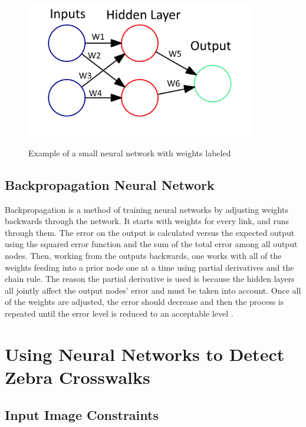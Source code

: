\documentclass[12pt]{ucthesis}
\newcommand{\captionfonts}{\small\bf\ssp}
\begin{document}
\begin{figure}[t]
\begin{center}
\includegraphics[width=10cm]{simpler.png}
\captionfonts
\caption[Small Neural Network Example]{Example of a small neural network with weights labeled}
\label{fig:smallNN}
\end{center}
\end{figure}

\section{Backpropagation Neural Network}
\label{Backpropagation Neural Network}
Backpropagation is a method of training neural networks by adjusting weights backwards through the network. It starts with weights for every link, and runs through them. The error on the output is calculated versus the expected output using the squared error function and the sum of the total error among all output nodes. Then, working from the outputs backwards, one works with all of the weights feeding into a prior node one at a time using partial derivatives and the chain rule. The reason the partial derivative is used is because the hidden layers all jointly affect the output nodes' error and must be taken into account. Once all of the weights are adjusted, the error should decrease and then the process is repeated until the error level is reduced to an acceptable level \cite{backpropositionPaper}. 

\chapter{Using Neural Networks to Detect Zebra Crosswalks}

\section{Input Image Constraints}
\label{Input Image Constraints}
\end{document}

